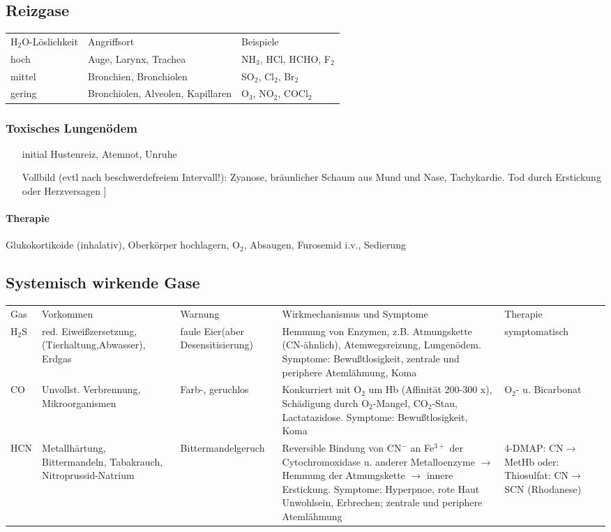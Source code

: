 \documentclass[10pt,a4paper]{report}
\begin{document}
\subsection{Reizgase} %
\label{sub:reizgase}
\begin{tabularx}{\textwidth}{XXX}
H$_2$O-Löslichkeit&Angriffsort&Beispiele\\
hoch&Auge, Larynx, Trachea&NH$_3$, HCl, HCHO, F$_2$\\
mittel&Bronchien, Bronchiolen&SO$_2$, Cl$_2$, Br$_2$\\
gering&Bronchiolen, Alveolen, Kapillaren&O$_3$, NO$_2$, COCl$_2$\\
\end{tabularx}
\subsubsection{Toxisches Lungenödem} %
\label{ssub:toxisches_lungen_dem}
\begin{itemize}
	\item[initial] Hustenreiz, Atemnot, Unruhe
	\item[Vollbild] (evtl nach beschwerdefreiem Intervall!): Zyanose, bräunlicher Schaum aus Mund und Nase, Tachykardie. Tod durch Erstickung oder Herzversagen ]
\end{itemize}
\paragraph{Therapie} %
\label{par:therapie}
Glukokortikoide (inhalativ), Oberkörper hochlagern, O$_2$, Absaugen, Furosemid i.v., Sedierung
\subsection{Systemisch wirkende Gase} %
\label{sub:systemisch_wirkende_gase}
\begin{tabularx}{\textwidth}{lXXXX}
Gas&Vorkommen&Warnung&Wirkmechanismus und Symptome&Therapie\\
H$_2$S&red. Eiweißzersetzung, (Tierhaltung,Abwasser), Erdgas&faule Eier(aber Desensitisierung)&Hemmung von Enzymen, z.B. Atmungskette (CN-ähnlich), Atemwegsreizung, Lungenödem. Symptome: Bewußtlosigkeit, zentrale und periphere Atemlähmung, Koma&symptomatisch\\
CO&Unvollst. Verbrennung, Mikroorganismen&Farb-, geruchlos&Konkurriert mit O$_2$ um Hb (Affinität 200-300 x), Schädigung durch O$_2$-Mangel, CO$_2$-Stau, Lactatazidose. Symptome: Bewußtlosigkeit, Koma&O$_2$- u. Bicarbonat\\
HCN&Metallhärtung, Bittermandeln, Tabakrauch, Nitroprussid-Natrium&Bittermandelgeruch&Reversible Bindung von CN$^-$ an Fe$^{3+}$ der Cytochromoxidase u. anderer Metalloenzyme $\rightarrow$ Hemmung der Atmungskette $\rightarrow$ innere Erstickung. Symptome: Hyperpnoe, rote Haut Unwohlsein, Erbrechen; zentrale und periphere Atemlähmung&4-DMAP: CN$\rightarrow$MetHb oder: Thiosulfat: CN$\rightarrow$SCN (Rhodanese)\
\end{tabularx}
\end{document}

